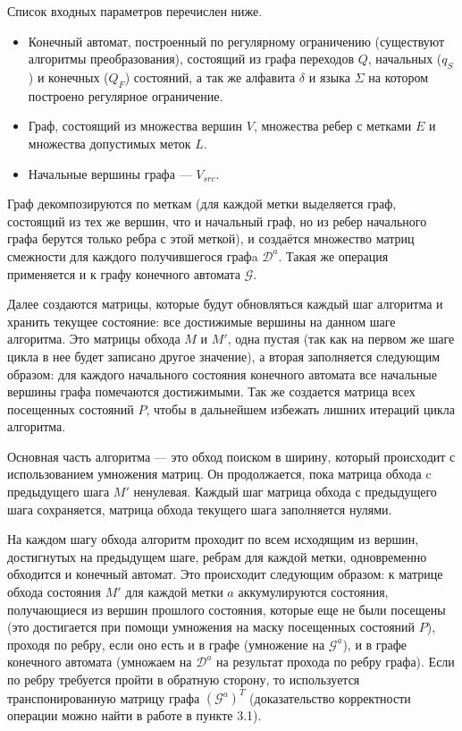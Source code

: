 Список входных параметров перечислен ниже.
\begin{itemize}
    \item Конечный автомат, построенный по регулярному ограничению (существуют алгоритмы преобразования), состоящий из графа переходов $Q$, начальных ($q_S$) и конечных ($Q_F$) состояний, а так же алфавита $\delta$ и языка $\Sigma$ на котором построено регулярное ограничение. 
    \item Граф, состоящий из множества вершин $V$, множества ребер с метками $E$ и множества допустимых меток $L$.
    \item Начальные вершины графа --- $V_{src}$.
\end{itemize}

Граф декомпозируются по меткам (для каждой метки выделяется граф, состоящий из тех же вершин, что и начальный граф, но из ребер начального графа берутся только ребра с этой меткой), и создаётся множество матриц смежности для каждого получившегося графa $\mathcal{D}^a$. Такая же операция применяется и к графу конечного автомата $\mathcal{G}$.

Далее создаются матрицы, которые будут обновляться каждый шаг алгоритма и хранить текущее состояние: все достижимые вершины на данном шаге алгоритма. Это матрицы обхода $M$ и $M'$, одна пустая (так как на первом же шаге цикла в нее будет записано другое значение), а вторая заполняется следующим образом: для каждого начального состояния конечного автомата все начальные вершины графа помечаются достижимыми.
Так же создается матрица всех посещенных состояний $P$, чтобы в дальнейшем избежать лишних итераций цикла алгоритма.

Основная часть алгоритма --- это обход поиском в ширину, который происходит с использованием умножения матриц. Он продолжается, пока матрица обхода c предыдущего шага $M'$ ненулевая. Каждый шаг матрица обхода с предыдущего шага сохраняется, матрица обхода текущего шага заполняется нулями.

На каждом шагу обхода алгоритм проходит по всем исходящим из вершин, достигнутых на предыдущем шаге, ребрам для каждой метки, одновременно обходится и конечный автомат. Это происходит следующим образом: к матрице обхода состояния $M'$ для каждой метки $a$ аккумулируются состояния, получающиеся из вершин прошлого состояния, которые еще не были посещены (это достигается при помощи умножения на маску посещенных состояний $P$), проходя по ребру, если оно есть и в графе (умножение на $\mathcal{G}^a$), и в графе конечного автомата (умножаем на $\mathcal{D}^a$ на результат прохода по ребру графа). Если по ребру требуется пройти в обратную сторону, то используется транспонированную матрицу графа $(\mathcal{G}^a)^T$ (доказательство корректности операции можно найти в работе в пункте 3.1). 

